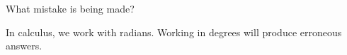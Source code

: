 \documentclass{ximera}
\begin{document}
\begin{question}
  What mistake is being made?

\begin{multipleChoice}
\end{multipleChoice}
\begin{feedback}
  In calculus, we work with radians. Working in degrees will produce
  erroneous answers.
\end{feedback}
\end{question}



\end{document}
